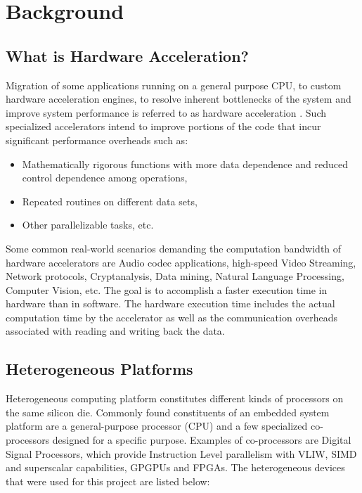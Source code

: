 \chapter{Background}
\label{ch2_background}
\section{What is Hardware Acceleration?}
\label{sect2_1}
Migration of some applications running on a general purpose CPU, to custom hardware acceleration engines, to resolve inherent bottlenecks of the system and improve system performance is referred to as hardware acceleration \cite{wiki_hwacc}. Such specialized accelerators intend to improve portions of the code that incur significant performance overheads such as:
\begin{itemize}
\item Mathematically rigorous functions with more data dependence and reduced control dependence among operations,
\item Repeated routines on different data sets,
\item Other parallelizable tasks, etc. 
\end{itemize}
Some common real-world scenarios demanding the computation bandwidth of hardware accelerators are Audio codec applications, high-speed Video Streaming, Network protocols, Cryptanalysis, Data mining, Natural Language Processing, Computer Vision, etc. \cite{ibm_devworks} The goal is to accomplish a faster execution time in hardware than in software. The hardware execution time includes the actual computation time by the accelerator as well as the communication overheads associated with reading and writing back the data. 

\section{Heterogeneous Platforms}
\label{sect2_2}
Heterogeneous computing platform constitutes different kinds of processors on the same silicon die. Commonly found constituents of an embedded system platform are a general-purpose processor (CPU) and a few specialized co-processors designed for a specific purpose. Examples of co-processors are Digital Signal Processors, which provide Instruction Level parallelism with VLIW, SIMD and superscalar capabilities, GPGPUs and FPGAs. The heterogeneous devices that were used for this project are listed below:
